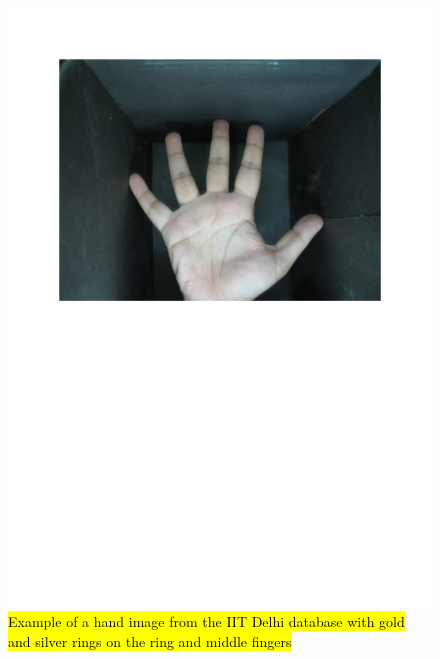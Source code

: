 \documentclass[review]{elsarticle}
\begin{document}
		\begin{figure}[!h]
			\centering
			\includegraphics[page=11,scale=.57,trim=1cm 14.7cm 1cm 1.7cm,clip]{IIT_problematic.pdf}
			\caption{\hl{Example of a hand image from the IIT Delhi database with gold and silver rings on the ring and middle fingers}}
			\label{fig:IIT_problematic_rings3}
		\end{figure}
\end{document}
